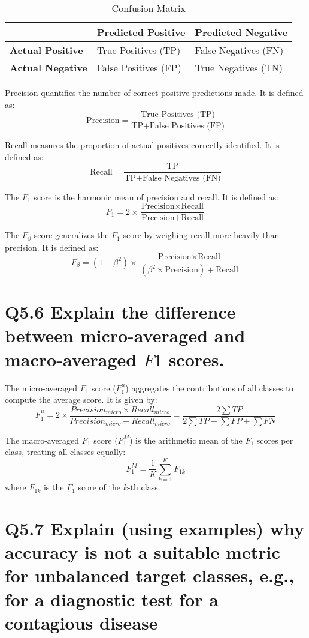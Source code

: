 \documentclass[11pt]{article}
\begin{document}
\begin{table}[h]
\centering
\begin{tabular}{l|l|l}
& \textbf{Predicted Positive} & \textbf{Predicted Negative} \\ \hline
\textbf{Actual Positive} & True Positives (TP) & False Negatives (FN) \\ \hline
\textbf{Actual Negative} & False Positives (FP) & True Negatives (TN) \\
\end{tabular}
\caption{Confusion Matrix}
\label{table:confusion_matrix}
\end{table}

Precision quantifies the number of correct positive predictions made. It is defined as:
\[ \text{Precision} = \frac{\text{True Positives (TP)}}{\text{TP} + \text{False Positives (FP)}} \]

Recall measures the proportion of actual positives correctly identified. It is defined as:
\[ \text{Recall} = \frac{\text{TP}}{\text{TP} + \text{False Negatives (FN)}} \]

The \( F_1 \) score is the harmonic mean of precision and recall. It is defined as:
\[ F_1 = 2 \times \frac{\text{Precision} \times \text{Recall}}{\text{Precision} + \text{Recall}} \]

The \( F_{\beta} \) score generalizes the \( F_1 \) score by weighing recall more heavily than precision. It is defined as:
\[ F_{\beta} = (1 + \beta^2) \times \frac{\text{Precision} \times \text{Recall}}{(\beta^2 \times \text{Precision}) + \text{Recall}} \]

\section{Q5.6 Explain the difference between micro-averaged and macro-averaged $F1$ scores. }

The micro-averaged \( F_1 \) score (\( F_1^{\mu} \)) aggregates the contributions of all classes to compute the average score. It is given by:
\[ F_1^{\mu} =2\times \frac{Precision_{micro}\times Recall_{micro}}{Precision_{micro}+Recall_{micro}} = \frac{2 \sum TP}{2 \sum TP + \sum FP + \sum FN} \]

The macro-averaged \( F_1 \) score (\( F_1^{M} \)) is the arithmetic mean of the \( F_1 \) scores per class, treating all classes equally:
\[ F_1^{M} = \frac{1}{K} \sum_{k=1}^{K} F_{1k} \]
where \( F_{1k} \) is the \( F_1 \) score of the \( k \)-th class.

\section{Q5.7 Explain (using examples) why accuracy is not a suitable metric for unbalanced target classes, e.g., for a diagnostic test for a contagious disease}
\end{document}
